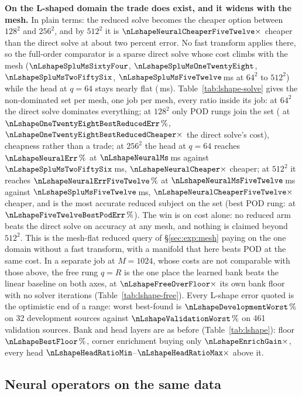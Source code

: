 \textbf{On the L-shaped domain the trade does exist, and it widens with the
mesh.} In plain terms: the reduced solve becomes the cheaper option between
$128^2$ and $256^2$, and by $512^2$ it is $\nLshapeNeuralCheaperFiveTwelve\times$
cheaper than the direct solve at about two percent error. No fast transform
applies there, so the full-order comparator is a sparse direct solve whose cost
climbs with the mesh ($\nLshapeSpluMsSixtyFour$,
$\nLshapeSpluMsOneTwentyEight$, $\nLshapeSpluMsTwoFiftySix$,
$\nLshapeSpluMsFiveTwelve$\,ms at $64^2$ to $512^2$) while the head at $q=64$
stays nearly flat (\nLshapeNeuralMsTrend\,ms). Table~\ref{tab:lshape-solve}
gives the non-dominated set per mesh, one job per mesh, every ratio inside its
job: at $64^2$ the direct solve dominates everything; at $128^2$ only POD rungs
join the set (\nLshapeOneTwentyEightBestReduced{} at
$\nLshapeOneTwentyEightBestReducedErr\,\%$,
$\nLshapeOneTwentyEightBestReducedCheaper\times$ the direct solve's cost),
cheapness rather than a trade; at $256^2$ the head at $q=64$ reaches
$\nLshapeNeuralErr\,\%$ at $\nLshapeNeuralMs$\,ms against
$\nLshapeSpluMsTwoFiftySix$\,ms, $\nLshapeNeuralCheaper\times$ cheaper; at
$512^2$ it reaches $\nLshapeNeuralErrFiveTwelve\,\%$ at
$\nLshapeNeuralMsFiveTwelve$\,ms against $\nLshapeSpluMsFiveTwelve$\,ms,
$\nLshapeNeuralCheaperFiveTwelve\times$ cheaper, and is the most accurate
reduced subject on the set (best POD rung: \nLshapeFiveTwelveBestPod{} at
$\nLshapeFiveTwelveBestPodErr\,\%$). The win is on cost alone: no reduced arm
beats the direct solve on accuracy at any mesh, and nothing is claimed beyond
$512^2$. This is the mesh-flat reduced query of \S\ref{sec:exp:mesh} paying on
the one domain without a fast transform, with a manifold that here beats POD
at the same cost. In a separate job at $M=1024$, whose costs are not comparable with those above,
the free rung $q=R$ is the one place the learned bank beats the linear baseline
on both axes, at $\nLshapeFreeOverFloor\times$ its own bank floor with no solver
iterations (Table~\ref{tab:lshape-free}). Every L-shape error quoted is the optimistic end of a range: worst best-found is
$\nLshapeDevelopmentWorst\,\%$ on 32 development sources against
$\nLshapeValidationWorst\,\%$ on 461 validation sources. Bank and head layers are as before (Table~\ref{tab:lshape}): floor
$\nLshapeBestFloor\,\%$, corner enrichment buying only
$\nLshapeEnrichGain\times$, every head
$\nLshapeHeadRatioMin$--$\nLshapeHeadRatioMax\times$ above it.

\subsection{Neural operators on the same data}
\label{sec:exp:operators}

